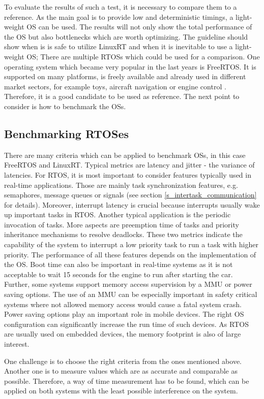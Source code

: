 To evaluate the results of such a test, it is necessary to compare them to a reference. 
As the main goal is to provide low and deterministic timings, a light-weight \ac{OS} can be used.
The results will not only show the total performance of the \ac{OS} but also bottlenecks which are worth optimizing. 
The guideline should show when is is safe to utilize LinuxRT and when it is inevitable to use a light-weight \ac{OS};
There are multiple \acp{RTOS} which could be used for a comparison. 
One operating system which became very popular in the last years is FreeRTOS.
It is supported on many platforms, is freely available and already used in different market sectors, for example toys, aircraft navigation or engine control \cite{freertos}. 
Therefore, it is a good candidate to be used as reference.  
The next point to consider is how to benchmark the \acp{OS}.
 
\subsection{Benchmarking RTOSes}
There are many criteria which can be applied to benchmark \acp{OS}, in this case FreeRTOS and LinuxRT.
Typical metrics are latency and jitter - the variance of latencies.
For \ac{RTOS}, it is most important to consider features typically used in real-time applications.
Those are mainly task synchronization features, e.g. semaphores, message queues or signals (see section \ref{s_intertask_communication} for details).
Moreover, interrupt latency is crucial because interrupts usually wake up important tasks in \ac{RTOS}.
Another typical application is the periodic invocation of tasks. 
More aspects are preemption time of tasks and priority inheritance mechanisms to resolve deadlocks.
These two metrics indicate the capability of the system to interrupt a low priority task to run a task with higher priority. 
The performance of all these features depends on the implementation of the \ac{OS}.
Boot time can also be important in real-time systems as it is not acceptable to wait 15 seconds for the engine to run after starting the car.
Further, some systems support memory access supervision by a \ac{MMU} or power saving options.
The use of an \ac{MMU} can be especially important in safety critical systems where not allowed memory access would cause a fatal system crash.
Power saving options play an important role in mobile devices.
The right \ac{OS} configuration can significantly increase the run time of such devices.
As \ac{RTOS} are usually used on embedded devices, the memory footprint is also of large interest. 
\par
One challenge is to choose the right criteria from the ones mentioned above. 
Another one is to measure values which are as accurate and comparable as possible.
Therefore, a way of time measurement has to be found, which can be applied on both systems with the least possible interference on the system.

